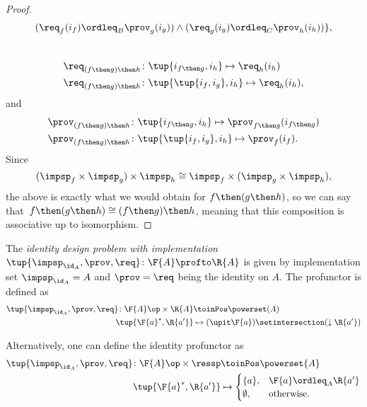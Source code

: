 \begin{proof}
\begin{equation}
\begin{aligned}
			(\req_f(i_f) \ordleq_{B} \prov_g(i_g))
			\wedge
			(\req_g(i_g) \ordleq_{C} \prov_h(i_h))
			\},
		\end{aligned}
	\end{equation}
	~
	\begin{equation}
		\begin{aligned}
			\req_{(f\then g)\then h} & \colon  \tup{i_{f\then g},i_h} \mapsto \req_h(i_h)    \\
			\req_{(f\then g)\then h} & \colon  \tup{\tup{i_f, i_g},i_h} \mapsto \req_h(i_h),
		\end{aligned}
	\end{equation}
	and
	\begin{equation}
		\begin{aligned}
			\prov_{(f\then g)\then h} & \colon  \tup{i_{f\then g},i_h} \mapsto \prov_{f\then g}(i_{f\then g}) \\
			\prov_{(f\then g)\then h} & \colon  \tup{\tup{i_f, i_g},i_h} \mapsto \prov_f(i_f).
		\end{aligned}
	\end{equation}
	Since
	\begin{equation}
		(\impsp_f \times \impsp_g)
		\times \impsp_{h} \cong  \impsp_f \times (\impsp_g \times \impsp_{h}),
	\end{equation}
	the above is exactly what we would obtain for $f\then (g\then h)$, so we can say that~$f\then(g\then h)\cong (f\then g)\then h$, meaning that this composition is associative up to isomorphism.
\end{proof}

\begin{definition}
	\label{def:identitydpi}
	The \emph{identity design problem with implementation}~$\tup{\impsp_{\id_A},\prov,\req} \colon \F{A} \profto \R{A}$ is given by implementation set $\impsp_{\id_A} = A$ and $\prov=\req$ being the identity on $A$.
	The profunctor is defined as
	\begin{align}
		\tup{\impsp_{\id_A},\prov,\req} \colon \F{A}\op \times \R{A} & \toinPos \powerset(A)                                      \\
		\tup{\F{a}^*,\R{a'}}                                         & \mapsto (\upit \F{a}) \setintersection (\downarrow \R{a'})
	\end{align}
\end{definition}
\begin{remark}
	Alternatively, one can define the identity profunctor as
	\begin{align}
		\tup{\impsp_{\id_A},\prov,\req}\colon \F{A}\op \times \ressp & \toinPos \powerset{A} \\
		\tup{\F{a}^*,\R{a'}}                                         & \mapsto
		\begin{cases}
			\{a\},     & \F{a}\ordleq_A \R{a'} \\
			\emptyset, & \text{otherwise}.
		\end{cases}
	\end{align}
\end{remark}

